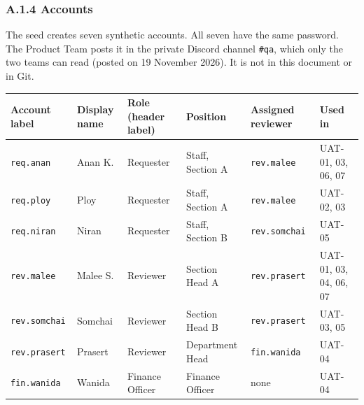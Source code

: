 \subsubsection*{A.1.4 Accounts}

The seed creates seven synthetic accounts. All seven have the same password. The Product Team posts it in the private Discord channel \texttt{\#qa}, which only the two teams can read (posted on 19 November 2026). It is not in this document or in Git.

{\def\LTcaptype{none} %
\begin{longtable}[]{@{}
  >{\raggedright\arraybackslash}p{}
  >{\raggedright\arraybackslash}p{}
  >{\raggedright\arraybackslash}p{}
  >{\raggedright\arraybackslash}p{}
  >{\raggedright\arraybackslash}p{}
  >{\raggedright\arraybackslash}p{}@{}}
\toprule\noalign{}
\begin{minipage}[b]{\linewidth}\raggedright
Account label
\end{minipage} & \begin{minipage}[b]{\linewidth}\raggedright
Display name
\end{minipage} & \begin{minipage}[b]{\linewidth}\raggedright
Role (header label)
\end{minipage} & \begin{minipage}[b]{\linewidth}\raggedright
Position
\end{minipage} & \begin{minipage}[b]{\linewidth}\raggedright
Assigned reviewer
\end{minipage} & \begin{minipage}[b]{\linewidth}\raggedright
Used in
\end{minipage} \\
\midrule\noalign{}
\endhead
\bottomrule\noalign{}
\endlastfoot
\texttt{req.anan} & Anan K. & Requester & Staff, Section A & \texttt{rev.malee} & UAT-01, 03, 06, 07 \\
\texttt{req.ploy} & Ploy & Requester & Staff, Section A & \texttt{rev.malee} & UAT-02, 03 \\
\texttt{req.niran} & Niran & Requester & Staff, Section B & \texttt{rev.somchai} & UAT-05 \\
\texttt{rev.malee} & Malee S. & Reviewer & Section Head A & \texttt{rev.prasert} & UAT-01, 03, 04, 06, 07 \\
\texttt{rev.somchai} & Somchai & Reviewer & Section Head B & \texttt{rev.prasert} & UAT-03, 05 \\
\texttt{rev.prasert} & Prasert & Reviewer & Department Head & \texttt{fin.wanida} & UAT-04 \\
\texttt{fin.wanida} & Wanida & Finance Officer & Finance Officer & none & UAT-04 \\
\end{longtable}
}

